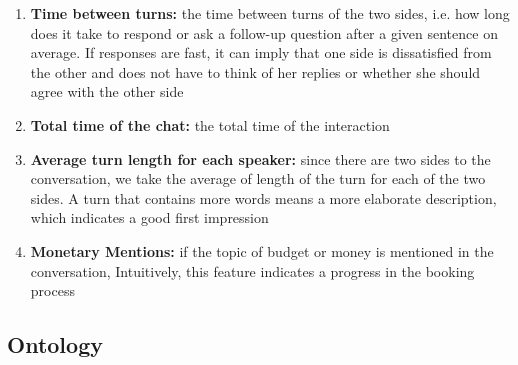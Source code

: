 \begin{enumerate}
\item {\bf Time between turns: } the time between 
turns of the two sides, i.e. how long does it take to respond or ask a follow-up 
question after a given sentence on average. 
If responses are fast, it can imply that one side is dissatisfied 
from the other and does not have to think of her replies or whether 
she should agree with the other side\label{itm:between}

\item {\bf Total time of the chat: } the total time of the interaction \label{itm:total}

\item {\bf Average turn length for each speaker: } since there are two sides to the conversation, 
we take the average of length of the turn for each of the two sides. 
A turn that contains more words means a more elaborate description, which indicates 
a good first impression\label{itm:sent}


\item {\bf Monetary Mentions: } if the topic of budget or money is mentioned in the conversation, 
Intuitively, this feature indicates a progress in the booking process\label{itm:budget}

\end{enumerate} 

\subsection{Ontology}
